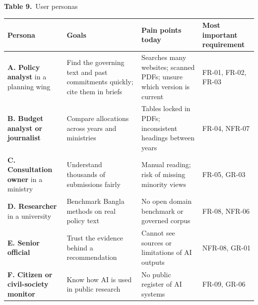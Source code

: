\documentclass[border=10pt]{standalone}
\begin{document}
\begin{minipage}{17cm}
{\large\bfseries Table 9.}\ {\large User personas}\par\vspace{7pt}
\small
{}
\begin{tabularx}{\linewidth}{@{}>{\hsize=0.840\hsize\raggedright\arraybackslash}X>{\hsize=0.988\hsize\raggedright\arraybackslash}X>{\hsize=1.185\hsize\raggedright\arraybackslash}X>{\hsize=0.988\hsize\raggedright\arraybackslash}X@{}}
\arrayrulecolor{bapilrule}\toprule
\rowcolor{white}\textbf{Persona} & \textbf{Goals} & \textbf{Pain points today} & \textbf{Most important requirement} \\
\midrule
\textbf{A. Policy analyst} in a planning wing & Find the governing text and past commitments quickly; cite them in briefs & Searches many websites; scanned PDFs; unsure which version is current & FR-01, FR-02, FR-03 \\
\textbf{B. Budget analyst or journalist} & Compare allocations across years and ministries & Tables locked in PDFs; inconsistent headings between years & FR-04, NFR-07 \\
\textbf{C. Consultation owner} in a ministry & Understand thousands of submissions fairly & Manual reading; risk of missing minority views & FR-05, GR-03 \\
\textbf{D. Researcher} in a university & Benchmark Bangla methods on real policy text & No open domain benchmark or governed corpus & FR-08, NFR-06 \\
\textbf{E. Senior official} & Trust the evidence behind a recommendation & Cannot see sources or limitations of AI outputs & NFR-08, GR-01 \\
\textbf{F. Citizen or civil-society monitor} & Know how AI is used in public research & No public register of AI systems & FR-09, GR-06 \\
\bottomrule
\end{tabularx}
\par{}
\end{minipage}
\end{document}
